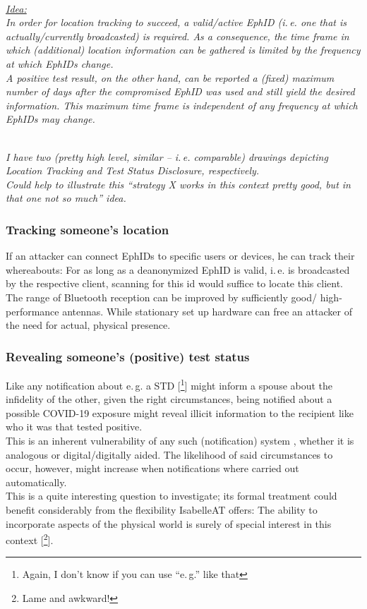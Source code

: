 \documentclass{article}
\newcommand*{\TODO}[2][todoC]{{\color{#1} #2}}
\newcommand*{\TODOsty}[2][styC]{\TODO[#1]{#2}}
\newcommand*{\TODOnsr}[2][nsrC]{\TODO[#1]{#2}}
\newcommand*{\NOTE}[2][noteC]{\TODO[#1]{\textit{#2}}}
\newcommand*{\TODOfn}[2][noteC]{\TODO[#1]{[\footnote{\TODO[#1]{#2}}]}}
\begin{document}
\NOTE{%
  \vspace{.25em}\\
  \underline{Idea:}\\
  In order for location tracking to succeed, a valid/active EphID (i.\,e. one
  that is actually/currently broadcasted) is required.
  As a consequence, the time frame in which (additional) location information
  can be gathered is limited by the frequency at which EphIDs change.\\
  A positive test result, on the other hand, can be reported a (fixed)
  maximum number of days after the compromised EphID was used
  and still yield the desired information.
  This maximum time frame is independent of any frequency at which EphIDs
  may change.}

\NOTE{%
  \vspace{.25em}\\
  I have two (pretty high level, similar -- i.\,e. comparable) drawings
  depicting Location Tracking and Test Status Disclosure, respectively.\\
  Could help to illustrate this
  ``strategy X works in this context pretty good,
  but in that one not so much'' idea.}

\subsubsection{Tracking someone's location}
\TODOnsr{If} an attacker can connect EphIDs to specific users or devices, he can track their whereabouts: For as long as a deanonymized EphID is valid, i.\,e. is broadcasted by the respective client, scanning for this id would suffice to locate \TODOnsr{this} client.\\
The range of Bluetooth reception can be improved by \TODOsty{sufficiently good/ high-performance} antennas. While \TODOnsr{stationary set up} hardware \TODOsty{can free an attacker of the need for actual, physical presence}.

\subsubsection{Revealing someone's (positive) test status}
Like any notification about \TODOsty{e.\,g. a STD}\TODOfn[styC]{%
  Again, I don't know if you can use ``e.\,g.'' like that}
  might inform a spouse about the infidelity of the other, given the right circumstances, being notified about a possible COVID-19 exposure might reveal illicit information to the recipient like who it was \TODOsty{that} tested \TODOnsr{positive}.\\
  This is an inherent vulnerability of any such \TODOnsr{(notification)} system\TODOnsr{,
    whether it is analogous or} \TODOsty{digital/digitally aided}.
  The likelihood of said circumstances to \TODOnsr{occur}, however, might increase when notifications where carried out automatically.\\
  This is a \TODOnsr{quite interesting question to investigate}; its formal treatment could benefit considerably from the flexibility IsabelleAT offers: The ability to incorporate aspects of the physical world is \TODOsty{surely of special interest in this context}\TODOfn[styC]{Lame and awkward!}.
\end{document}
